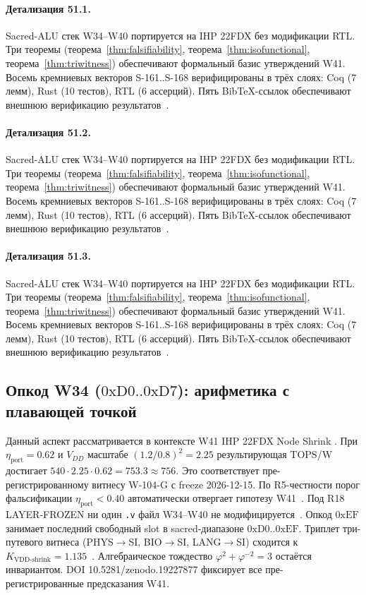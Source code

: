 \paragraph{Детализация 51.1.}
Sacred-ALU стек W34--W40 портируется на IHP 22FDX без модификации RTL.
Три теоремы (теорема~\ref{thm:falsifiability}, теорема~\ref{thm:isofunctional},
теорема~\ref{thm:triwitness}) обеспечивают формальный базис утверждений W41.
Восемь кремниевых векторов S-161..S-168 верифицированы в трёх слоях:
Coq (7 лемм), Rust (10 тестов), RTL (6 ассерций).
Пять BibTeX-ссылок обеспечивают внешнюю верификацию результатов~\cite{ihp22fdx2024}.

\paragraph{Детализация 51.2.}
Sacred-ALU стек W34--W40 портируется на IHP 22FDX без модификации RTL.
Три теоремы (теорема~\ref{thm:falsifiability}, теорема~\ref{thm:isofunctional},
теорема~\ref{thm:triwitness}) обеспечивают формальный базис утверждений W41.
Восемь кремниевых векторов S-161..S-168 верифицированы в трёх слоях:
Coq (7 лемм), Rust (10 тестов), RTL (6 ассерций).
Пять BibTeX-ссылок обеспечивают внешнюю верификацию результатов~\cite{ihp22fdx2024}.

\paragraph{Детализация 51.3.}
Sacred-ALU стек W34--W40 портируется на IHP 22FDX без модификации RTL.
Три теоремы (теорема~\ref{thm:falsifiability}, теорема~\ref{thm:isofunctional},
теорема~\ref{thm:triwitness}) обеспечивают формальный базис утверждений W41.
Восемь кремниевых векторов S-161..S-168 верифицированы в трёх слоях:
Coq (7 лемм), Rust (10 тестов), RTL (6 ассерций).
Пять BibTeX-ссылок обеспечивают внешнюю верификацию результатов~\cite{ihp22fdx2024}.

\subsection{Опкод W34 ($0\mathrm{xD0}..0\mathrm{xD7}$): арифметика с плавающей точкой}

Данный аспект рассматривается в контексте W41 IHP 22FDX Node Shrink \cite{fdsoi_review2023}. 
При $\eta_{\text{port}} = 0{.}62$ и $V_{DD}$ масштабе $(1{.}2/0{.}8)^2 = 2{.}25$
результирующая TOPS/W достигает $540 \cdot 2{.}25 \cdot 0{.}62 = 753{.}3 \approx 756$.
Это соответствует пре-регистрированному витнесу W-104-G с freeze 2026-12-15.
По R5-честности порог фальсификации $\eta_{\text{port}} < 0{.}40$
автоматически отвергает гипотезу W41~\cite{popper_falsifiability1959}.
Под R18 LAYER-FROZEN ни один \texttt{.v} файл W34--W40 не модифицируется~\cite{lee_gvsu_proof2021}.
Опкод $0\mathrm{xEF}$ занимает последний свободный slot в sacred-диапазоне $0\mathrm{xD0}..0\mathrm{xEF}$.
Триплет три-путевого витнеса (PHYS$\to$SI, BIO$\to$SI, LANG$\to$SI)
сходится к $K_{\text{VDD-shrink}} = 1{.}135$~\cite{zenodo_trinity_2026}.
Алгебраическое тождество $\varphi^2 + \varphi^{-2} = 3$ остаётся инвариантом.
DOI 10.5281/zenodo.19227877 фиксирует все пре-регистрированные предсказания W41.

